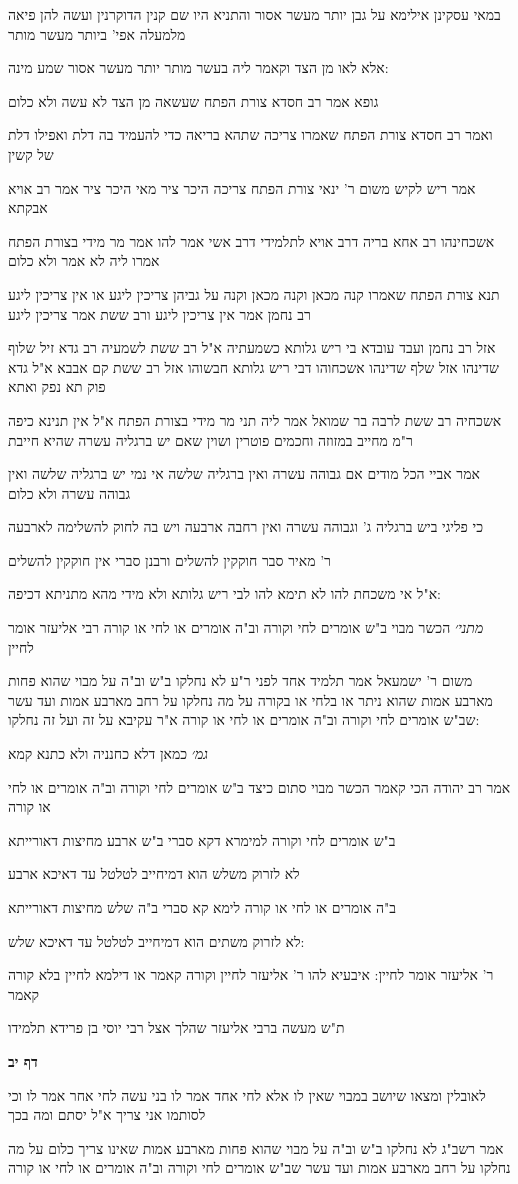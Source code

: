 \documentclass[12pt, openany]{book}
\newcommand{\sethebfont}{
\fontsize{10.5pt}{21.0pt} \selectfont
}
\newcommand{\textblock}[1]{
{\sethebfont #1\\}	
}
\newcommand{\sectname}{}
\newcommand{\newsection}[1]{
	\addcontentsline{toc}{section}{#1}
	\renewcommand{\sectname}{#1}	
	\vspace{-\baselineskip}
	\begin{center}
		\textbf{%
\fontsize{16pt}{16pt}\selectfont
			#1}
	\end{center}
	\vspace{-\baselineskip}
	\nopagebreak
}
\begin{document}
\textblock{במאי עסקינן אילימא על גבן יותר מעשר אסור והתניא היו שם קנין הדוקרנין ועשה להן פיאה מלמעלה אפי' ביותר מעשר מותר}
\textblock{אלא לאו מן הצד וקאמר ליה בעשר מותר יותר מעשר אסור שמע מינה:}
\textblock{גופא אמר רב חסדא צורת הפתח שעשאה מן הצד לא עשה ולא כלום}
\textblock{ואמר רב חסדא צורת הפתח שאמרו צריכה שתהא בריאה כדי להעמיד בה דלת ואפילו דלת של קשין}
\textblock{אמר ריש לקיש משום ר' ינאי צורת הפתח צריכה היכר ציר מאי היכר ציר אמר רב אויא אבקתא}
\textblock{אשכחינהו רב אחא בריה דרב אויא לתלמידי דרב אשי אמר להו אמר מר מידי בצורת הפתח אמרו ליה לא אמר ולא כלום}
\textblock{תנא צורת הפתח שאמרו קנה מכאן וקנה מכאן וקנה על גביהן צריכין ליגע או אין צריכין ליגע רב נחמן אמר אין צריכין ליגע ורב ששת אמר צריכין ליגע}
\textblock{אזל רב נחמן ועבד עובדא בי ריש גלותא כשמעתיה א"ל רב ששת לשמעיה רב גדא זיל שלוף שדינהו אזל שלף שדינהו אשכחוהו דבי ריש גלותא חבשוהו אזל רב ששת קם אבבא א"ל גדא פוק תא נפק ואתא}
\textblock{אשכחיה רב ששת לרבה בר שמואל אמר ליה תני מר מידי בצורת הפתח א"ל אין תנינא כיפה ר"מ מחייב במזוזה וחכמים פוטרין ושוין שאם יש ברגליה עשרה שהיא חייבת}
\textblock{אמר אביי הכל מודים אם גבוהה עשרה ואין ברגליה שלשה אי נמי יש ברגליה שלשה ואין גבוהה עשרה ולא כלום}
\textblock{כי פליגי ביש ברגליה ג' וגבוהה עשרה ואין רחבה ארבעה ויש בה לחוק להשלימה לארבעה}
\textblock{ר' מאיר סבר חוקקין להשלים ורבנן סברי אין חוקקין להשלים}
\textblock{א"ל אי משכחת להו לא תימא להו לבי ריש גלותא ולא מידי מהא מתניתא דכיפה:}
\textblock{{\large\emph{מתני׳}} הכשר מבוי ב"ש אומרים לחי וקורה וב"ה אומרים או לחי או קורה רבי אליעזר אומר לחיין}
\textblock{משום ר' ישמעאל אמר תלמיד אחד לפני ר"ע לא נחלקו ב"ש וב"ה על מבוי שהוא פחות מארבע אמות שהוא ניתר או בלחי או בקורה על מה נחלקו על רחב מארבע אמות ועד עשר שב"ש אומרים לחי וקורה וב"ה אומרים או לחי או קורה א"ר עקיבא על זה ועל זה נחלקו:}
\textblock{{\large\emph{גמ׳}} כמאן דלא כחנניה ולא כתנא קמא}
\textblock{אמר רב יהודה הכי קאמר הכשר מבוי סתום כיצד ב"ש אומרים לחי וקורה וב"ה אומרים או לחי או קורה}
\textblock{ב"ש אומרים לחי וקורה למימרא דקא סברי ב"ש ארבע מחיצות דאורייתא}
\textblock{לא לזרוק משלש הוא דמיחייב לטלטל עד דאיכא ארבע}
\textblock{ב"ה אומרים או לחי או קורה לימא קא סברי ב"ה שלש מחיצות דאורייתא}
\textblock{לא לזרוק משתים הוא דמיחייב לטלטל עד דאיכא שלש:}
\textblock{ר' אליעזר אומר לחיין: איבעיא להו ר' אליעזר לחיין וקורה קאמר או דילמא לחיין בלא קורה קאמר}
\textblock{ת"ש מעשה ברבי אליעזר שהלך אצל רבי יוסי בן פרידא תלמידו}
\newsection{דף יב}
\textblock{לאובלין ומצאו שיושב במבוי שאין לו אלא לחי אחד אמר לו בני עשה לחי אחר אמר לו וכי לסותמו אני צריך א"ל יסתם ומה בכך}
\textblock{אמר רשב"ג לא נחלקו ב"ש וב"ה על מבוי שהוא פחות מארבע אמות שאינו צריך כלום על מה נחלקו על רחב מארבע אמות ועד עשר שב"ש אומרים לחי וקורה וב"ה אומרים או לחי או קורה}
\end{document}

